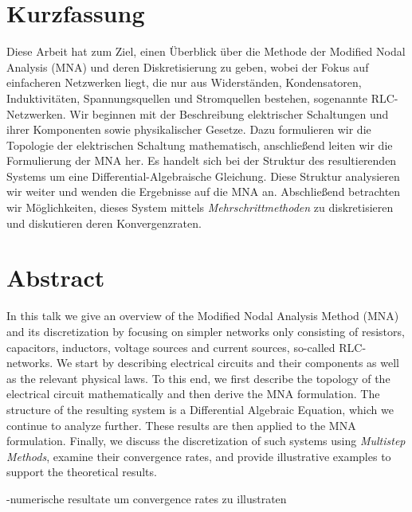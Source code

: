 
{%
	\chapter*{Kurzfassung}
	
		Diese Arbeit hat zum Ziel, einen Überblick über die Methode der Modified Nodal Analysis (MNA) und deren Diskretisierung zu geben, wobei der Fokus auf einfacheren Netzwerken liegt, die nur aus Widerständen, Kondensatoren, Induktivitäten, Spannungsquellen und Stromquellen bestehen, sogenannte RLC-Netzwerken. Wir beginnen mit der Beschreibung elektrischer Schaltungen und ihrer Komponenten sowie physikalischer Gesetze. Dazu formulieren wir die Topologie der elektrischen Schaltung mathematisch, anschließend leiten wir die Formulierung der MNA her. Es handelt sich bei der Struktur des resultierenden Systems um eine Differential-Algebraische Gleichung. Diese Struktur analysieren wir weiter und wenden die Ergebnisse auf die MNA an. Abschließend betrachten wir Möglichkeiten, dieses System mittels \emph{Mehrschrittmethoden} zu diskretisieren und diskutieren deren Konvergenzraten.
}

{%
	\chapter*{Abstract}
			
		In this talk we give an overview of the Modified Nodal Analysis Method (MNA) and its discretization by focusing on simpler networks only consisting of resistors, capacitors, inductors, voltage sources and current sources, so-called RLC-networks. We start by describing electrical circuits and their components as well as the relevant physical laws. To this end, we first describe the topology of the electrical circuit mathematically and then derive the MNA formulation. The structure of the resulting system is a Differential Algebraic Equation, which we continue to analyze further. These results are then applied to the MNA formulation. Finally, we discuss the discretization of such systems using \emph{Multistep Methods}, examine their convergence rates, and provide illustrative examples to support the theoretical results.
		
		
		
		
		-numerische resultate um convergence rates zu illustraten
}